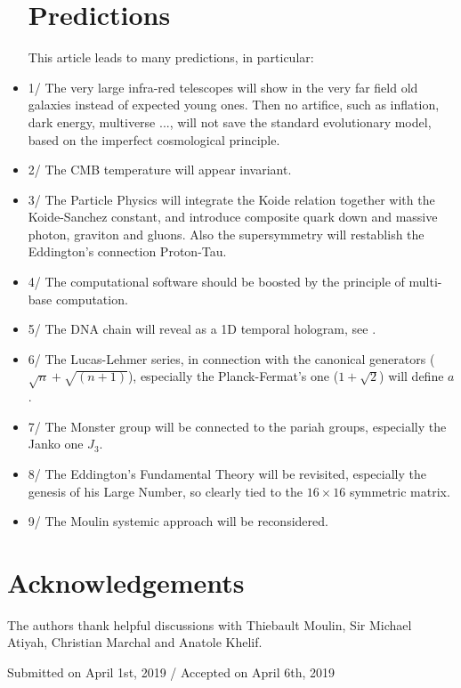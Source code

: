 \documentclass[twoside,draft]{article}
\begin{document}
\begin{sloppypar}
\begin{itemize}
\section{Predictions}

 

      This article leads to many predictions, in particular:
\item 1/  The very large infra-red telescopes will show in the very far field old galaxies instead of expected young ones. Then no artifice, such as inflation, dark energy, multiverse ..., will not save the standard evolutionary model, based on the imperfect cosmological principle.
\item 2/ The CMB temperature will appear invariant. 
\item 3/ The Particle Physics will integrate the Koide relation together with the Koide-Sanchez constant, and introduce composite quark down and massive photon, graviton and gluons. Also the supersymmetry will restablish the Eddington's connection Proton-Tau.
\item 4/ The computational software should be boosted by the principle of multi-base computation.
\item 5/ The DNA chain will reveal as a 1D temporal hologram, see \cite{Widom}.
\item 6/ The Lucas-Lehmer series, in connection with the canonical generators ($\sqrt{n}+\sqrt{(n+1)}$), especially the Planck-Fermat's one ($1+\sqrt2$) will define $a$.
\item 7/ The Monster group will be connected to the pariah groups, especially the Janko one $J_3$.
\item 8/ The Eddington's Fundamental Theory will be revisited, especially the genesis of his Large Number, so clearly tied to the $16 \times 16$ symmetric matrix.
\item 9/ The Moulin systemic approach will be reconsidered.
\end{itemize}

\section*{Acknowledgements}
The authors thank helpful discussions with Thiebault Moulin, Sir Michael Atiyah, Christian Marchal and Anatole Khelif. 
%
\begin{flushright}\footnotesize
Submitted on April 1st, 2019 / Accepted on April 6th, 2019
\end{flushright}



\end{sloppypar}
\end{document}
